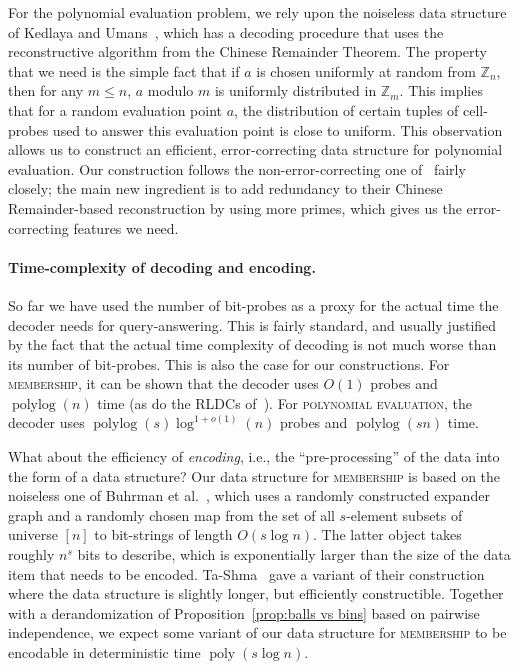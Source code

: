 \documentclass[11pt,english]{article}
\newcommand{\noun}[1]{\textsc{#1}}
\theoremstyle{definition}
\theoremstyle{remark}
\newcommand{\Z}{\mathbb{Z}}
\newcommand{\polyn}{\operatorname{poly}}
\newcommand{\polylog}{\operatorname{polylog} }
\begin{document}
For the polynomial evaluation problem, we rely upon the noiseless data structure of Kedlaya and Umans~\cite{kedl-umans}, which has a decoding procedure that uses the reconstructive algorithm from the Chinese Remainder Theorem.  
The property that we need is the simple fact that
if $a$ is chosen uniformly at random from $\Z_{n}$, then for any
$m\leq n$, $a$ modulo $m$ is uniformly distributed in $\Z_{m}$.
This implies that for a random evaluation point $a$, the distribution of certain tuples of cell-probes used to answer this evaluation point is close to uniform. This observation allows us to construct an efficient, error-correcting data structure for polynomial evaluation.
Our construction follows the non-error-correcting one of~\cite{kedl-umans}
fairly closely; the main new ingredient is to add redundancy to their Chinese Remainder-based reconstruction by using more primes, which gives us the error-correcting features we need. 

\paragraph{\textbf{Time-complexity of decoding and encoding.} }
So far we have used the number of bit-probes as a proxy for the actual time the decoder needs for query-answering.
This is fairly standard, and usually justified by the fact that the actual time complexity of decoding is 
not much worse than its number of bit-probes.  This is also the case for our constructions.
For \noun{membership}, it can be shown that the decoder uses $O(1)$ probes and $\polylog(n)$ time
(as do the RLDCs of~\cite{bghsv04}).
For \noun{polynomial evaluation}, the decoder uses $\polylog(s)\log^{1+o(1)}(n)$ probes and $\polylog(sn)$ time.

\iffalse
What about the efficiency of \emph{encoding}, i.e., the ``pre-processing'' of the data into the form of a data structure?
Our data structure for \noun{membership} is based on the noiseless one of Buhrman et al.~\cite{bmrv:bitvectorsj}, 
which uses a randomly constructed expander graph and a randomly chosen map from the set 
of all $s$-element subsets of universe $[n]$ to bit-strings of length $O(s\log n)$.
The latter object takes roughly $n^s$ bits to describe, which is exponentially larger than the size of the
data item that needs to be encoded. Ta-Shma~\cite{tashma:storing} gave a variant of their construction where 
the data structure is slightly longer, but efficiently constructible.
Together with a derandomization of Proposition~\ref{prop:balls vs bins} based on pairwise independence, 
we expect some variant of our data structure for \noun{membership} to be encodable in deterministic time $\polyn(s\log n)$.
\end{document}
